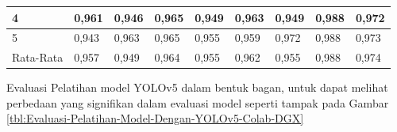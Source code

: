 \begin{singlespace}
\begin{table}[H]
\begin{tabular}{|p{1cm}|p{1cm}p{1cm}|p{1cm}p{1cm}|p{1cm}p{1cm}|p{1cm}p{1cm}|}
			4                                              & \multicolumn{1}{p{1cm}|}{0,961}                                    & 0,946     & \multicolumn{1}{p{1cm}|}{0,965}                                    & 0,949     & \multicolumn{1}{p{1cm}|}{0,963}                                    & 0,949     & \multicolumn{1}{p{1cm}|}{0,988}                                     & 0,972     \\ \hline
			
			5                                              & \multicolumn{1}{p{1cm}|}{0,943}                                    & 0,963     & \multicolumn{1}{p{1cm}|}{0,965}                                    & 0,955     & \multicolumn{1}{p{1cm}|}{0,959}                                    & 0,972     & \multicolumn{1}{p{1cm}|}{0,988}                                     & 0,973     \\ \hline
			
			Rata-Rata                                      & \multicolumn{1}{p{1cm}|}{0,957}                                    & 0,949     & \multicolumn{1}{p{1cm}|}{0,964}                                    & 0,955     & \multicolumn{1}{p{1cm}|}{0,962}                                    & 0,955     & \multicolumn{1}{p{1cm}|}{0,988}                                     & 0,974     \\ \hline
		\end{tabular}
	\end{table}
\end{singlespace}

Evaluasi Pelatihan model YOLOv5 dalam bentuk bagan, untuk dapat melihat perbedaan yang signifikan dalam evaluasi model seperti tampak pada Gambar \ref{tbl:Evaluasi-Pelatihan-Model-Dengan-YOLOv5-Colab-DGX}

